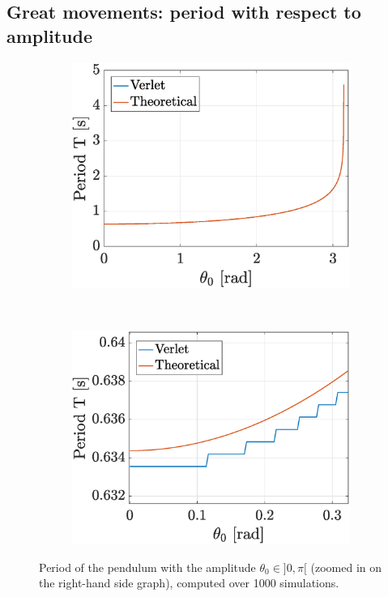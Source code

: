 \documentclass[a4paper,12pt,twoside]{article}
\begin{document}
\subsection{Great movements: period with respect to amplitude}

\begin{figure}[h]
\centering
\begin{subfigure}[t]{0.45\textwidth}
	\includegraphics[width=\textwidth]{graphs/b_period.eps}
\end{subfigure}
~
\begin{subfigure}[t]{0.45\textwidth}
	\includegraphics[width=\textwidth]{graphs/b_period_zoom.eps}
\end{subfigure}
\caption{Period of the pendulum with the amplitude $\theta_0 \in ]0,\pi[$ (zoomed in on the right-hand side graph), computed over \num{1000} simulations.}
\label{fig:b-period}
\end{figure}
\end{document}
